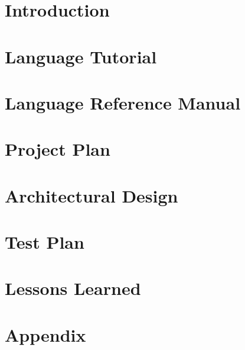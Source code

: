 \documentclass[11pt]{article}
\begin{document}
\section{Introduction}

\newpage

\section{Language Tutorial}

\newpage

\section{Language Reference Manual}

\newpage

\section{Project Plan}

\newpage

\section{Architectural Design}
%
\newpage

\section{Test Plan}
%
\newpage

\section{Lessons Learned}
%
\newpage

\section{Appendix}
%
\newpage
\end{document}
